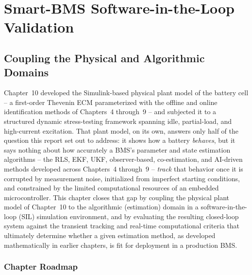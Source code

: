\chapter{Smart-BMS Software-in-the-Loop Validation}
\label{chap:sil_validation}

\section{Coupling the Physical and Algorithmic Domains}
\label{sec:sil_coupling}

Chapter~10 developed the Simulink-based physical plant model of the battery cell -- a first-order Thevenin ECM parameterized with the offline and online identification methods of Chapters~4 through~9 -- and subjected it to a structured dynamic stress-testing framework spanning idle, partial-load, and high-current excitation. That plant model, on its own, answers only half of the question this report set out to address: it shows how a battery \emph{behaves}, but it says nothing about how accurately a BMS's parameter and state estimation algorithms -- the RLS, EKF, UKF, observer-based, co-estimation, and AI-driven methods developed across Chapters~4 through~9 -- \emph{track} that behavior once it is corrupted by measurement noise, initialized from imperfect starting conditions, and constrained by the limited computational resources of an embedded microcontroller. This chapter closes that gap by coupling the physical plant model of Chapter~10 to the algorithmic (estimation) domain in a software-in-the-loop (SIL) simulation environment, and by evaluating the resulting closed-loop system against the transient tracking and real-time computational criteria that ultimately determine whether a given estimation method, as developed mathematically in earlier chapters, is fit for deployment in a production BMS.

\subsection{Chapter Roadmap}
\label{ssec:ch11_roadmap}

